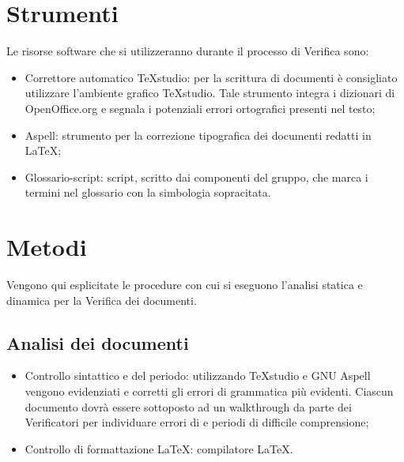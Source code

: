 \newpage
\section{Strumenti}
\label{10.0}
Le risorse software che si utilizzeranno durante il processo di Verifica sono:
\begin{itemize}
\item Correttore automatico TeXstudio: per la scrittura di documenti è consigliato utilizzare l'ambiente grafico TeXstudio. Tale strumento integra i dizionari di OpenOffice.org e segnala i potenziali errori ortografici presenti nel testo;
\item Aspell: strumento per la correzione tipografica dei documenti redatti in \LaTeX ;
\item Glossario-script: script, scritto dai componenti del gruppo, che marca i termini nel glossario con la simbologia sopracitata.
\end{itemize}

\newpage
\section{Metodi}
\label{11.0}
Vengono qui esplicitate le procedure con cui si eseguono l'analisi statica e dinamica per la Verifica dei documenti.

\subsection{Analisi dei documenti}
\label{11.1}
\begin{itemize}
\item Controllo sintattico e del periodo:
utilizzando TeXstudio e GNU Aspell vengono evidenziati e corretti gli errori di
grammatica più evidenti. Ciascun documento dovrà essere sottoposto ad un walkthrough da parte dei Verificatori per individuare errori di  e periodi di difficile comprensione;
\item Controllo di formattazione \LaTeX:
compilatore \LaTeX.
\end{itemize}

